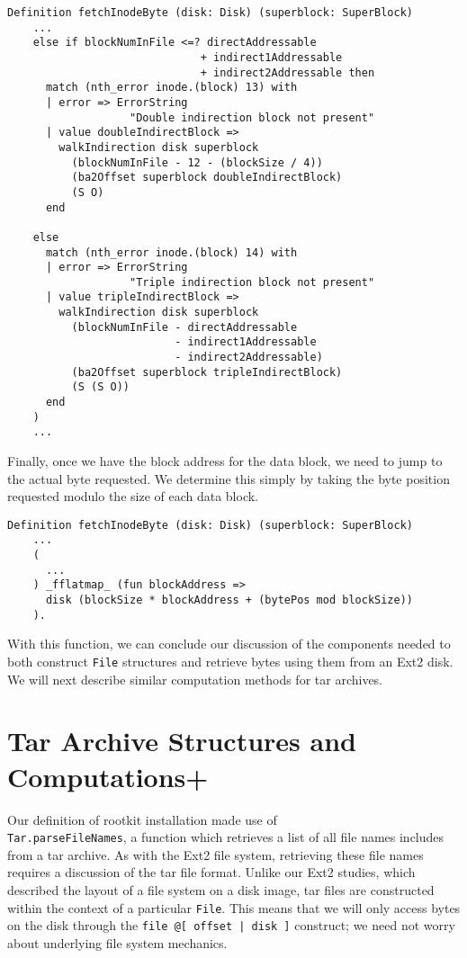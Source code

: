 \documentclass[nocopyrightspace]{sigplanconf}
\begin{document}
\begin{lstlisting}
Definition fetchInodeByte (disk: Disk) (superblock: SuperBlock)
    ...
    else if blockNumInFile <=? directAddressable
                              + indirect1Addressable
                              + indirect2Addressable then
      match (nth_error inode.(block) 13) with
      | error => ErrorString 
                   "Double indirection block not present"
      | value doubleIndirectBlock =>
        walkIndirection disk superblock
          (blockNumInFile - 12 - (blockSize / 4)) 
          (ba2Offset superblock doubleIndirectBlock) 
          (S O)
      end

    else 
      match (nth_error inode.(block) 14) with
      | error => ErrorString 
                   "Triple indirection block not present"
      | value tripleIndirectBlock =>
        walkIndirection disk superblock 
          (blockNumInFile - directAddressable
                          - indirect1Addressable
                          - indirect2Addressable)
          (ba2Offset superblock tripleIndirectBlock)
          (S (S O))
      end
    ) 
    ...
\end{lstlisting}

Finally, once we have the block address for the data block, we need to jump to
the actual byte requested. We determine this simply by taking the byte
position requested modulo the size of each data block.

\begin{lstlisting}
Definition fetchInodeByte (disk: Disk) (superblock: SuperBlock)
    ...
    (
      ...
    ) _fflatmap_ (fun blockAddress =>
      disk (blockSize * blockAddress + (bytePos mod blockSize))
    ).
\end{lstlisting}

With this function, we can conclude our discussion of the components needed
to both construct {\tt File} structures and retrieve bytes using them from an
Ext2 disk. We will next describe similar computation methods for tar archives.

\section{Tar Archive Structures and Computations+}
\label{sec:tar}

Our definition of rootkit installation made use of \\{\tt Tar.parseFileNames},
a function which retrieves a list of all file names includes from a tar
archive. As with the Ext2 file system, retrieving these file names requires a
discussion of the tar file format. Unlike our Ext2 studies, which described
the layout of a file system on a disk image, tar files are constructed within
the context of a particular {\tt File}. This means that we will only access
bytes on the disk through the {\tt file @[ offset | disk ]} construct; we need
not worry about underlying file system mechanics.
\end{document}
